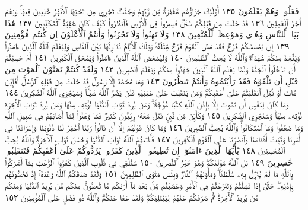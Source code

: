 فَعَلُوا۟ وَهُمْ يَعْلَمُونَ ١٣٥ أُو۟لَٰٓئِكَ جَزَآؤُهُم مَّغْفِرَةࣱ مِّن
رَّبِّهِمْ وَجَنَّٰتࣱ تَجْرِي مِن تَحْتِهَا ٱلْأَنْهَٰرُ خَٰلِدِينَ فِيهَاۚ وَنِعْمَ
أَجْرُ ٱلْعَٰمِلِينَ ١٣٦ قَدْ خَلَتْ مِن قَبْلِكُمْ سُنَنࣱ فَسِيرُوا۟
فِي ٱلْأَرْضِ فَٱنظُرُوا۟ كَيْفَ كَانَ عَٰقِبَةُ ٱلْمُكَذِّبِينَ ١٣٧
هَٰذَا بَيَانࣱ لِّلنَّاسِ وَهُدࣰى وَمَوْعِظَةࣱ لِّلْمُتَّقِينَ ١٣٨
وَلَا تَهِنُوا۟ وَلَا تَحْزَنُوا۟ وَأَنتُمُ ٱلْأَعْلَوْنَ إِن كُنتُم مُّؤْمِنِينَ ١٣٩
إِن يَمْسَسْكُمْ قَرْحࣱ فَقَدْ مَسَّ ٱلْقَوْمَ قَرْحࣱ مِّثْلُهُۥۚ وَتِلْكَ
ٱلْأَيَّامُ نُدَاوِلُهَا بَيْنَ ٱلنَّاسِ وَلِيَعْلَمَ ٱللَّهُ ٱلَّذِينَ ءَامَنُوا۟
وَيَتَّخِذَ مِنكُمْ شُهَدَآءَۗ وَٱللَّهُ لَا يُحِبُّ ٱلظَّٰلِمِينَ ١٤٠
وَلِيُمَحِّصَ ٱللَّهُ ٱلَّذِينَ ءَامَنُوا۟ وَيَمْحَقَ ٱلْكَٰفِرِينَ ١٤١ أَمْ
حَسِبْتُمْ أَن تَدْخُلُوا۟ ٱلْجَنَّةَ وَلَمَّا يَعْلَمِ ٱللَّهُ ٱلَّذِينَ جَٰهَدُوا۟
مِنكُمْ وَيَعْلَمَ ٱلصَّٰبِرِينَ ١٤٢ وَلَقَدْ كُنتُمْ تَمَنَّوْنَ ٱلْمَوْتَ مِن
قَبْلِ أَن تَلْقَوْهُ فَقَدْ رَأَيْتُمُوهُ وَأَنتُمْ تَنظُرُونَ ١٤٣ وَمَا مُحَمَّدٌ
إِلَّا رَسُولࣱ قَدْ خَلَتْ مِن قَبْلِهِ ٱلرُّسُلُۚ أَفَإِي۟ن مَّاتَ أَوْ قُتِلَ
ٱنقَلَبْتُمْ عَلَىٰٓ أَعْقَٰبِكُمْۚ وَمَن يَنقَلِبْ عَلَىٰ عَقِبَيْهِ فَلَن يَضُرَّ
ٱللَّهَ شَيْـࣰٔاۚ وَسَيَجْزِي ٱللَّهُ ٱلشَّٰكِرِينَ ١٤٤ وَمَا كَانَ
لِنَفْسٍ أَن تَمُوتَ إِلَّا بِإِذْنِ ٱللَّهِ كِتَٰبࣰا مُّؤَجَّلࣰاۗ وَمَن يُرِدْ
ثَوَابَ ٱلدُّنْيَا نُؤْتِهِۦ مِنْهَا وَمَن يُرِدْ ثَوَابَ ٱلْأٓخِرَةِ نُؤْتِهِۦ مِنْهَاۚ
وَسَنَجْزِي ٱلشَّٰكِرِينَ ١٤٥ وَكَأَيِّن مِّن نَّبِيࣲّ قَٰتَلَ مَعَهُۥ
رِبِّيُّونَ كَثِيرࣱ فَمَا وَهَنُوا۟ لِمَآ أَصَابَهُمْ فِي سَبِيلِ ٱللَّهِ وَمَا ضَعُفُوا۟
وَمَا ٱسْتَكَانُوا۟ۗ وَٱللَّهُ يُحِبُّ ٱلصَّٰبِرِينَ ١٤٦ وَمَا كَانَ قَوْلَهُمْ إِلَّآ أَن
قَالُوا۟ رَبَّنَا ٱغْفِرْ لَنَا ذُنُوبَنَا وَإِسْرَافَنَا فِيٓ أَمْرِنَا وَثَبِّتْ أَقْدَامَنَا
وَٱنصُرْنَا عَلَى ٱلْقَوْمِ ٱلْكَٰفِرِينَ ١٤٧ فَـَٔاتَىٰهُمُ ٱللَّهُ ثَوَابَ
ٱلدُّنْيَا وَحُسْنَ ثَوَابِ ٱلْأٓخِرَةِۗ وَٱللَّهُ يُحِبُّ ٱلْمُحْسِنِينَ ١٤٨
يَٰٓأَيُّهَا ٱلَّذِينَ ءَامَنُوٓا۟ إِن تُطِيعُوا۟ ٱلَّذِينَ كَفَرُوا۟
يَرُدُّوكُمْ عَلَىٰٓ أَعْقَٰبِكُمْ فَتَنقَلِبُوا۟ خَٰسِرِينَ ١٤٩
بَلِ ٱللَّهُ مَوْلَىٰكُمْۖ وَهُوَ خَيْرُ ٱلنَّٰصِرِينَ ١٥٠ سَنُلْقِي
فِي قُلُوبِ ٱلَّذِينَ كَفَرُوا۟ ٱلرُّعْبَ بِمَآ أَشْرَكُوا۟ بِٱللَّهِ
مَا لَمْ يُنَزِّلْ بِهِۦ سُلْطَٰنࣰاۖ وَمَأْوَىٰهُمُ ٱلنَّارُۖ وَبِئْسَ
مَثْوَى ٱلظَّٰلِمِينَ ١٥١ وَلَقَدْ صَدَقَكُمُ ٱللَّهُ
وَعْدَهُۥٓ إِذْ تَحُسُّونَهُم بِإِذْنِهِۦۖ حَتَّىٰٓ إِذَا فَشِلْتُمْ
وَتَنَٰزَعْتُمْ فِي ٱلْأَمْرِ وَعَصَيْتُم مِّنۢ بَعْدِ مَآ أَرَىٰكُم
مَّا تُحِبُّونَۚ مِنكُم مَّن يُرِيدُ ٱلدُّنْيَا وَمِنكُم مَّن
يُرِيدُ ٱلْأٓخِرَةَۚ ثُمَّ صَرَفَكُمْ عَنْهُمْ لِيَبْتَلِيَكُمْۖ
وَلَقَدْ عَفَا عَنكُمْۗ وَٱللَّهُ ذُو فَضْلٍ عَلَى ٱلْمُؤْمِنِينَ ١٥٢
